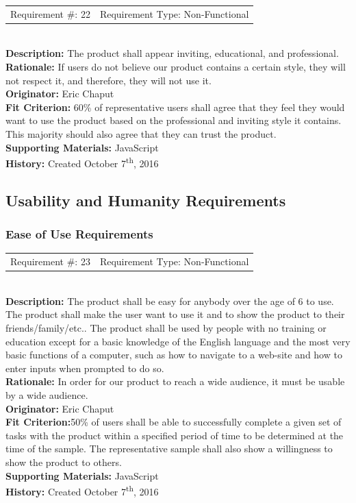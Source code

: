 \documentclass[12pt, titlepage]{article}
\begin{document}
\begin{reqbox}
%
\begin{tabular}{cc}
Requirement \#: 22 & Requirement Type: Non-Functional \\
\end{tabular} \\
%
\textbf{Description:} The product shall appear inviting, educational, and 
professional. \\
\textbf{Rationale:}  If users do not believe our product contains a certain 
style, they will not respect it, and therefore, they will not use it.\\
\textbf{Originator:} Eric Chaput\\
\textbf{Fit Criterion:} 60\% of representative users shall agree that they feel 
they would want to use the product based on the professional and inviting style 
it contains. This majority should also agree that they can trust the product.\\
%  
\textbf{Supporting Materials:} JavaScript \\
\textbf{History:} Created October 7\textsuperscript{th}, 2016
%
\end{reqbox}

\subsection{Usability and Humanity Requirements}

\subsubsection{Ease of Use Requirements}
\begin{reqbox}
%
\begin{tabular}{cc}
Requirement \#: 23 & Requirement Type: Non-Functional \\
\end{tabular} \\
%
\textbf{Description:} The product shall be easy for anybody over the age of 6 to 
use. The product shall make the user want to use it and to show the product to 
their friends/family/etc.. The product shall be used by people with no training 
or education except for a basic knowledge of the English language and the most 
very basic functions of a computer, such as how to navigate to a web-site and 
how to enter inputs when prompted to do so. \\
\textbf{Rationale:}  In order for our product to reach a wide audience, it must 
be usable by a wide audience.\\
\textbf{Originator:} Eric Chaput\\
\textbf{Fit Criterion:}50\% of users 
shall be able to successfully complete a given set of tasks with the product 
within a specified period of time to be determined at the time of the sample. 
The representative sample shall also show a willingness to show the product to 
others.\\
%  
\textbf{Supporting Materials:} JavaScript \\
\textbf{History:} Created October 7\textsuperscript{th}, 2016
%
\end{reqbox}
\end{document}
